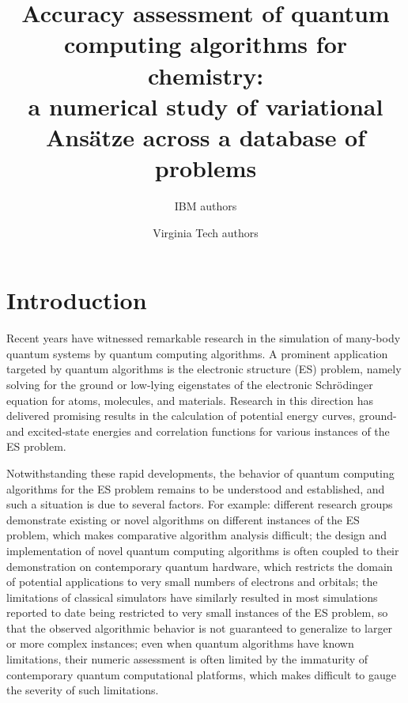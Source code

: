 \documentclass[aps,pra,onecolumn]{revtex4-2}
\begin{document}
\title{Accuracy assessment of quantum computing algorithms for chemistry: \\
a numerical study of variational Ans\"{a}tze across a database of problems}

\author{IBM authors}
\author{Virginia Tech authors}

\begin{abstract}
\end{abstract}

\maketitle

\section{Introduction}

Recent years have witnessed remarkable research in the simulation of many-body quantum systems  by quantum computing algorithms.
A prominent application targeted by quantum algorithms is the electronic structure (ES) problem, 
namely solving for the ground or low-lying eigenstates of the electronic Schr\"{o}dinger equation for atoms, molecules, and materials.
Research in this direction has delivered promising results in the calculation of potential energy curves, 
ground- and excited-state energies and correlation functions for various instances of the ES problem.

Notwithstanding these rapid developments, the behavior of quantum computing algorithms for the ES problem remains to be understood and established,
and such a situation is due to several factors. For example: 
different research groups demonstrate existing or novel algorithms on different instances of the ES problem, which makes comparative algorithm analysis difficult;
the design and implementation of novel quantum computing algorithms is often coupled to their demonstration on contemporary quantum hardware, which restricts the domain of potential applications to very small numbers of electrons and orbitals;
the limitations of classical simulators have similarly resulted in most simulations reported to date being restricted to very small instances of the ES problem, so that the observed algorithmic behavior is not guaranteed to generalize to larger or more complex instances;
even when quantum algorithms have known limitations, their numeric assessment is often limited by the immaturity of contemporary quantum computational platforms, which makes difficult to gauge the severity of such limitations.
\end{document}
